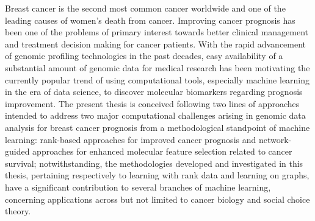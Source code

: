 Breast cancer is the second most common cancer worldwide and one of the leading causes of women's death from cancer. Improving cancer prognosis has been one of the problems of primary interest towards better clinical management and treatment decision making for cancer patients. With the rapid advancement of genomic profiling technologies in the past decades, easy availability of a substantial amount of genomic data for medical research has been motivating the currently popular trend of using computational tools, especially machine learning in the era of data science, to discover molecular biomarkers regarding prognosis improvement. The present thesis is conceived following two lines of approaches intended to address two major computational challenges arising in genomic data analysis for breast cancer prognosis from a methodological standpoint of machine learning: rank-based approaches for improved cancer prognosis and network-guided approaches for enhanced molecular feature selection related to cancer survival; notwithstanding, the methodologies developed and investigated in this thesis, pertaining respectively to learning with rank data and learning on graphs, have a significant contribution to several branches of machine learning, concerning applications across but not limited to cancer biology and social choice theory.